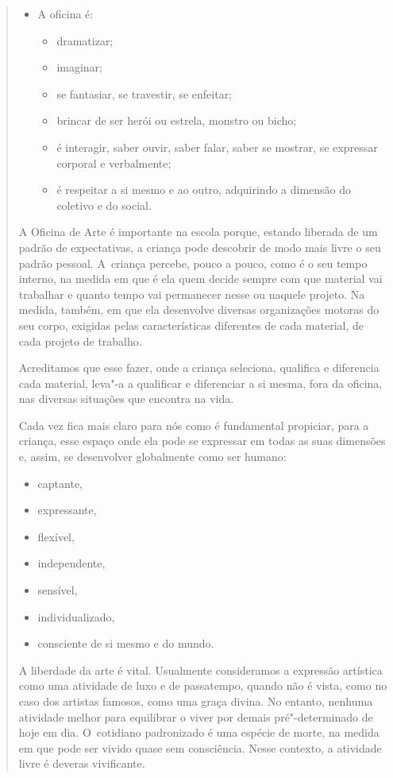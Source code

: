 \begin{quote}
\begin{itemize}
\item
  A oficina é:
  \begin{itemize}
  \item
    dramatizar;
  \item
    imaginar;
  \item
    se fantasiar, se travestir, se enfeitar;
  \item
    brincar de ser herói ou estrela, monstro ou bicho;
  \item
    é interagir, saber ouvir, saber falar, saber se mostrar, se
    expressar corporal e verbalmente;
  \item
    é respeitar a si mesmo e ao outro, adquirindo a dimensão do coletivo
    e do social.
  \end{itemize}
\end{itemize}
A Oficina de Arte é importante na escola porque, estando liberada de um
padrão de expectativas, a criança pode descobrir de modo mais livre o
seu padrão pessoal. A~criança percebe, pouco a pouco, como é o seu tempo
interno, na medida em que é ela quem decide sempre com que material vai
trabalhar e quanto tempo vai permanecer nesse ou naquele projeto. Na
medida, também, em que ela desenvolve diversas organizações motoras do
seu corpo, exigidas pelas características diferentes de cada material,
de cada projeto de trabalho.

Acreditamos que esse fazer, onde a criança seleciona, qualifica e
diferencia cada material, leva"-a a qualificar e diferenciar a si mesma,
fora da oficina, nas diversas situações que encontra na vida.

Cada vez fica mais claro para nós como é fundamental propiciar, para a
criança, esse espaço onde ela pode se expressar em todas as suas
dimensões e, assim, se desenvolver globalmente como ser humano:

\begin{itemize}
\item
  captante,
\item
  expressante,
\item
  flexível,
\item
  independente,
\item
  sensível,
\item
  individualizado,
\item
  consciente de si mesmo e do mundo.
\end{itemize}
A liberdade da arte é vital. Usualmente consideramos a expressão
artística como uma atividade de luxo e de passatempo, quando não é
vista, como no caso dos artistas famosos, como uma graça divina. No
entanto, nenhuma atividade melhor para equilibrar o viver por demais
pré"-determinado de hoje em dia. O~cotidiano padronizado é uma espécie de
morte, na medida em que pode ser vivido quase sem consciência. Nesse
contexto, a atividade livre é deveras vivificante.


\end{quote}
